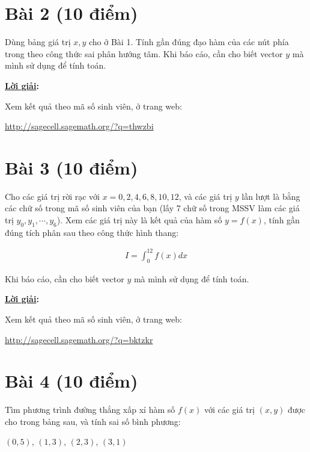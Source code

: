 \documentclass[12pt]{article}
\newcommand{\Solution}{
\medskip
{\bf \underline{Lời giải}:}
}
\begin{document}
\section{Bài 2 (10 điểm)}

Dùng bảng giá trị $x,y$ cho ở Bài 1. Tính gần đúng đạo hàm của các nút phía trong theo công thức sai phân hướng tâm. Khi báo cáo, cần cho biết vector $y$ mà mình sử dụng để tính toán.

\Solution

Xem kết quả theo mã số sinh viên, ở trang web: 

\url{http://sagecell.sagemath.org/?q=thwzbi}

\section{Bài 3 (10 điểm)}

Cho các giá trị rời rạc với $x = 0,2,4,6,8,10,12$, và các giá trị $y$ lần lượt là bằng các chữ số trong mã số sinh viên của bạn (lấy 7 chữ số trong MSSV làm các giá trị $y_0, y_1, \cdots, y_6$). Xem các giá trị này là kết quả của hàm số $y=f(x)$, tính gần đúng tích phân sau theo công thức hình thang:

\begin{align*}
 I = \int_0^{12} f(x) dx
\end{align*}

Khi báo cáo, cần cho biết vector $y$ mà mình sử dụng để tính toán.

\Solution

Xem kết quả theo mã số sinh viên, ở trang web: 

\url{http://sagecell.sagemath.org/?q=bktzkr}

\section{Bài 4 (10 điểm)}

Tìm phương trình đường thẳng xấp xỉ hàm số $f(x)$ với các giá trị $(x,y)$ được cho trong bảng sau, và tính sai số bình phương:

$(0,5)$, $(1,3)$, $(2,3)$, $(3,1)$



\end{document}
